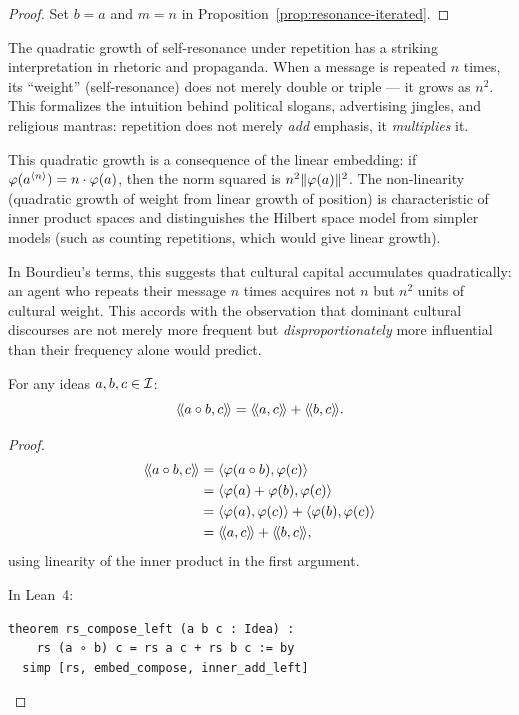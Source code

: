 \begin{proof}
Set $b = a$ and $m = n$ in Proposition~\ref{prop:resonance-iterated}.
\end{proof}

\begin{interpretation}
\label{interp:repetition}
The quadratic growth of self-resonance under repetition has a striking
interpretation in rhetoric and propaganda. When a message is repeated $n$
times, its ``weight'' (self-resonance) does not merely double or triple ---
it grows as $n^2$. This formalizes the intuition behind political slogans,
advertising jingles, and religious mantras: repetition does not merely
\emph{add} emphasis, it \emph{multiplies} it.

This quadratic growth is a consequence of the linear embedding: if
$\varphi(a^{\langle n \rangle}) = n \cdot \varphi(a)$, then the norm squared
is $n^2 \lVert \varphi(a) \rVert^2$. The non-linearity (quadratic growth of weight
from linear growth of position) is characteristic of inner product spaces
and distinguishes the Hilbert space model from simpler models (such as
counting repetitions, which would give linear growth).

In Bourdieu's terms, this suggests that cultural capital accumulates
quadratically: an agent who repeats their message $n$ times acquires not
$n$ but $n^2$ units of cultural weight. This accords with the observation
that dominant cultural discourses are not merely more frequent but
\emph{disproportionately} more influential than their frequency alone would
predict.
\end{interpretation}

\begin{proposition}
\label{prop:compose-resonance}
For any ideas $a, b, c \in \mathcal{I}$:
\[
  \langle\!\langle a \circ b, c \rangle\!\rangle = \langle\!\langle a, c \rangle\!\rangle + \langle\!\langle b, c \rangle\!\rangle.
\]
\end{proposition}

\begin{proof}
\begin{align*}
  \langle\!\langle a \circ b, c \rangle\!\rangle
  &= \langle \varphi(a \circ b), \varphi(c) \rangle \\
  &= \langle \varphi(a) + \varphi(b), \varphi(c) \rangle \\
  &= \langle \varphi(a), \varphi(c) \rangle + \langle \varphi(b), \varphi(c) \rangle \\
  &= \langle\!\langle a, c \rangle\!\rangle + \langle\!\langle b, c \rangle\!\rangle,
\end{align*}
using linearity of the inner product in the first argument.

In Lean~4:
\begin{lstlisting}
theorem rs_compose_left (a b c : Idea) :
    rs (a ∘ b) c = rs a c + rs b c := by
  simp [rs, embed_compose, inner_add_left]
\end{lstlisting}
\end{proof}

